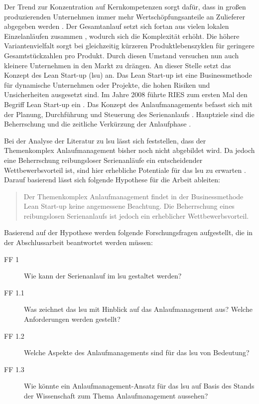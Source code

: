 Der Trend zur Konzentration auf Kernkompetenzen sorgt dafür, dass in großen produzierenden Unternehmen immer mehr Wertschöpfungsanteile an Zulieferer abgegeben werden  \autocite{Hilmola2015, Wildemann2008}. Der Gesamtanlauf setzt sich fortan aus vielen lokalen Einzelanläufen zusammen \autocite{Zimolong2006}, wodurch sich die Komplexität erhöht. 
Die höhere Variantenvielfalt sorgt bei gleichzeitig kürzeren Produktlebenszyklen für geringere Gesamtstückzahlen pro Produkt. Durch diesen Umstand versuchen nun auch kleinere Unternehmen in den Markt zu drängen.
An dieser Stelle setzt das Konzept des Lean Start-up (\gls{lsu}) an. Das Lean Start-up ist eine Businessmethode für dynamische Unternehmen oder Projekte, die hohen Risiken und Unsicherheiten ausgesetzt sind. 
Im Jahre 2008 führte RIES zum ersten Mal den Begriff Lean Start-up ein \autocite{Ries2008}. 
Das Konzept des Anlaufmanagements befasst sich mit der Planung, Durchführung und Steuerung des Serienanlaufs \autocite[S.8]{Kuhn2002}. Hauptziele sind die Beherrschung und die zeitliche Verkürzung der Anlaufphase \autocite{Kuhn2002, Schmitt2015}.

Bei der Analyse der Literatur zu \gls{lsu} lässt sich feststellen, dass der Themenkomplex Anlaufmanagement bisher noch nicht abgebildet wird. Da jedoch eine Beherrschung reibungsloser Serienanläufe ein entscheidender Wettbewerbsvorteil ist, sind hier erhebliche Potentiale für das \gls{lsu} zu erwarten \autocite[S.XI]{Bischoff2007}. Darauf basierend lässt sich folgende Hypothese für die Arbeit ableiten: 

\begin{quotation}
Der Themenkomplex Anlaufmanagement findet in der Businessmethode Lean Start-up keine angemessene Beachtung. Die Beherrschung eines reibungslosen Serienanlaufs ist jedoch ein erheblicher Wettbewerbsvorteil. 
\end{quotation}
Basierend auf der Hypothese werden folgende Forschungsfragen aufgestellt, die in der Abschlussarbeit beantwortet werden müssen: 

\begin{description}

\item[FF 1] Wie kann der Serienanlauf im \gls{lsu} gestaltet werden? 

\item[FF 1.1] Was zeichnet das \gls{lsu} mit Hinblick auf das Anlaufmanagement aus? Welche Anforderungen werden gestellt?

\item[FF 1.2] Welche Aspekte des Anlaufmanagements sind für das \gls{lsu} von Bedeutung? 

\item[FF 1.3] Wie könnte ein Anlaufmanagement-Ansatz für das \gls{lsu} auf Basis des Stands der Wissenschaft zum Thema Anlaufmanagement aussehen?  
\end{description}



